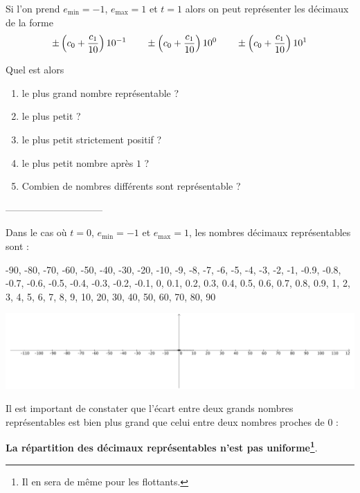 \exercice{}

Si l'on prend $e_{\min}=-1$, $e_{\max}=1$ et $t=1$ alors on peut représenter les décimaux de la forme 
$$ \pm \left( c_0 + \frac{c_1}{10} \right) 10^{-1} \qquad \pm \left( c_0 + \frac{c_1}{10} \right) 10^{0} \qquad \pm \left( c_0 + \frac{c_1}{10} \right) 10^{1}$$


Quel est alors
\medskip

\begin{enumerate}
\item le plus grand nombre représentable ?\\

\item le plus petit ?\\

\item le plus petit strictement positif ?\\

\item le plus petit nombre après $1$ ?\\

\item Combien de nombres différents sont représentable ?

\end{enumerate}


\begin{center}
------------------------------
\end{center}

Dans le cas où $t=0$, $e_{\min}=-1$ et $e_{\max}=1$, les nombres décimaux représentables sont :
\medskip

-90, -80, -70, -60, -50, -40, -30, -20, -10, -9, -8, -7, -6, -5, -4, -3, -2, -1, 
-0.9, -0.8, -0.7, -0.6, -0.5, -0.4, -0.3, -0.2, -0.1, 0, 0.1, 0.2, 0.3, 0.4, 0.5, 
0.6, 0.7, 0.8, 0.9, 1, 2, 3, 4, 5, 6, 7, 8, 9, 10, 20, 30, 40, 50, 60, 70, 80, 90

\begin{center}
\includegraphics[width=18cm]{Representables3.pdf} %
\end{center}


Il est important de constater que l'écart entre deux grands nombres représentables est bien plus grand que celui entre deux nombres proches de $0$ : \begin{center}
{\bf  La répartition des décimaux représentables n'est pas uniforme\footnote{Il en sera de même pour les flottants.}}.


\end{center}
\vfill
\eject
